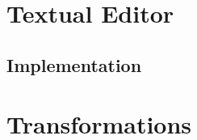 \documentclass[
  10pt,				%
  oneside,
  a4paper,			%
  brazilian,
  english
]{abntex2}
\begin{document}
\chapter{Textual Editor}

\section{Implementation}

\chapter{Transformations}

%
%
%
%
%



%


\end{document}
